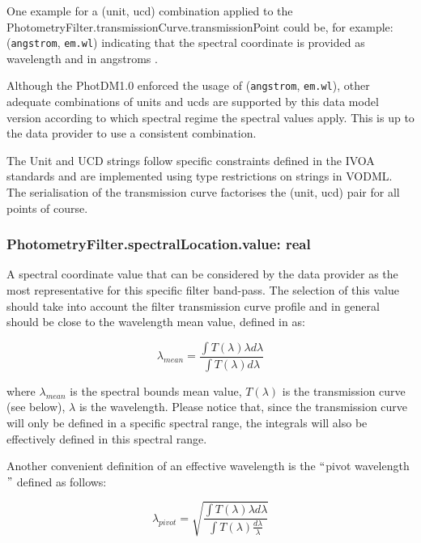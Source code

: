 \documentclass[11pt,a4paper]{ivoa}
\begin{document}
One example for a (unit, ucd) combination applied to the PhotometryFilter.transmissionCurve.transmissionPoint could be, for example:
(\texttt{angstrom}, \texttt{em.wl})
indicating that the spectral coordinate is provided as wavelength and in angstroms . 

\par

Although the PhotDM1.0 enforced the usage of (\texttt{angstrom}, \texttt{em.wl}), other adequate combinations of units and ucds are supported by this data model version 
according to which spectral regime the spectral values apply. This is up to the data provider to use a consistent combination.

The Unit and UCD strings follow specific constraints defined in the IVOA standards and are
implemented using type restrictions on strings in VODML.
The  serialisation of the transmission curve factorises the (unit, ucd) pair for all points of course.
\par

\subsubsection{PhotometryFilter.spectralLocation.value: real}
A spectral coordinate value that can be considered by the data provider as the
most representative for this specific filter band-pass. The selection of this
value should take into account the filter transmission curve profile and in
general should be close to the wavelength mean value, defined
in \citet{1982AJ.....87..670O} as:
\par
\begin{equation} \label{eq:16}
\lambda_{mean} = \frac{\int T(\lambda)\lambda d\lambda}{\int T(\lambda)d\lambda}
\end{equation}

where $\lambda_{mean}$ is the spectral bounds mean value, $T(\lambda)$ is
the transmission curve (see below), $\lambda$ is the wavelength. Please
notice that, since the transmission curve will only be defined in a specific
spectral range, the integrals will also be effectively defined in this
spectral range.
\par

Another convenient definition of an effective wavelength is the
$``$pivot wavelength$"$  defined as follows:

\begin{equation} \label{eq:17}
\lambda_{pivot} = \sqrt{\frac{\int T(\lambda)\lambda d\lambda}{\int T(\lambda)\frac{d\lambda}{\lambda}}}
\end{equation}
\end{document}

